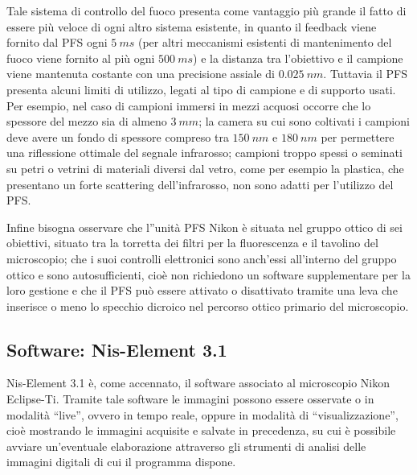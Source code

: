 Tale sistema di controllo del fuoco presenta come vantaggio più grande il fatto di essere più veloce di ogni altro sistema esistente, in quanto il feedback viene fornito dal PFS ogni $5\ ms$ (per altri meccanismi esistenti di mantenimento del fuoco viene fornito al più ogni $500\ ms$) e la distanza tra l'obiettivo e il campione viene mantenuta costante con una precisione assiale di $0.025\ nm$. 
Tuttavia il PFS presenta alcuni limiti di utilizzo, legati al tipo di campione e di supporto usati. 
Per esempio, nel caso di campioni immersi in mezzi acquosi occorre che lo spessore del mezzo sia di almeno $3\ mm$; la camera su cui sono coltivati i campioni deve avere un fondo di spessore compreso tra $150\ nm$ e $180\ nm$ per permettere una riflessione ottimale del segnale infrarosso; campioni troppo spessi o seminati su petri o vetrini di materiali diversi dal vetro, come per esempio la plastica, che presentano un forte scattering dell'infrarosso, non sono adatti per l'utilizzo del PFS. 

Infine bisogna osservare che l''unità PFS Nikon è situata nel gruppo ottico di sei obiettivi, situato tra la torretta dei filtri per la fluorescenza e il tavolino del microscopio; che i suoi controlli elettronici sono anch'essi all'interno del gruppo ottico e sono autosufficienti, cioè non richiedono un software supplementare per la loro gestione e che il PFS può essere attivato o disattivato tramite una leva che inserisce o meno lo specchio dicroico nel percorso ottico primario del microscopio.


\subsection{Software: Nis-Element 3.1}

Nis-Element 3.1 è, come accennato, il software associato al microscopio Nikon Eclipse-Ti.
Tramite tale software le immagini possono essere osservate o in modalità ``live'', ovvero in tempo reale, oppure in modalità di ``visualizzazione'', cioè mostrando le immagini acquisite e salvate in precedenza, su cui è possibile avviare un'eventuale elaborazione attraverso gli strumenti di analisi delle immagini digitali di cui il programma dispone.

